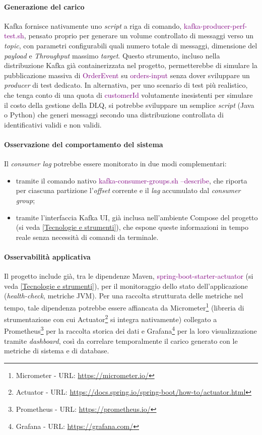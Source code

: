 \paragraph{Generazione del carico} Kafka fornisce nativamente uno \textit{script} a riga di comando, \textcolor{purple}{kafka-producer-perf-test.sh}, pensato proprio per generare un volume controllato di messaggi verso un \textit{topic}, con parametri configurabili quali numero totale di messaggi, dimensione del \textit{payload} e \textit{\gls{Throughput}} massimo \textit{target}. 
Questo strumento, incluso nella distribuzione Kafka già containerizzata nel progetto, permetterebbe di simulare la pubblicazione massiva di \textcolor{purple}{OrderEvent} su \textcolor{purple}{orders-input} senza dover sviluppare un \textit{producer} di test dedicato. 
In alternativa, per uno scenario di test più realistico, che tenga conto di una quota di \textcolor{purple}{customerId} volutamente inesistenti per simulare il costo della gestione della \acrshort{DLQ}, si potrebbe sviluppare un semplice \textit{script} (Java o Python) che generi messaggi secondo una distribuzione controllata di identificativi validi e non validi.

\paragraph{Osservazione del comportamento del sistema} Il \textit{consumer lag} potrebbe essere monitorato in due modi complementari: 
\begin{itemize}
    \item tramite il comando nativo \textcolor{purple}{kafka-consumer-groups.sh --describe}, che riporta per ciascuna partizione l'\textit{offset} corrente e il \textit{lag} accumulato dal \textit{consumer group};
    \item tramite l'interfaccia Kafka UI, già inclusa nell'ambiente  Compose del progetto (si veda \ref{Tecnologie e strumenti}), che espone queste informazioni in tempo reale senza necessità di comandi da terminale.
\end{itemize}

\paragraph{Osservabilità applicativa} Il progetto include già, tra le dipendenze Maven, \textcolor{purple}{spring-boot-starter-actuator} (si veda \ref{Tecnologie e strumenti}), per il monitoraggio dello stato dell'applicazione (\textit{health-check}, metriche \acrshort{JVM}). 
Per una raccolta strutturata delle metriche nel tempo, tale dipendenza potrebbe essere affiancata da Micrometer\footnote{Micrometer - URL: \url{https://micrometer.io/}} (libreria di strumentazione con cui Actuator\footnote{Actuator - URL: \url{https://docs.spring.io/spring-boot/how-to/actuator.html}} si integra nativamente) collegato a Prometheus\footnote{Prometheus - URL: \url{https://prometheus.io/}} per la raccolta storica dei dati e Grafana\footnote{Grafana - URL: \url{https://grafana.com/}} per la loro visualizzazione tramite \textit{dashboard}, così da correlare temporalmente il carico generato con le metriche di sistema e di database.

